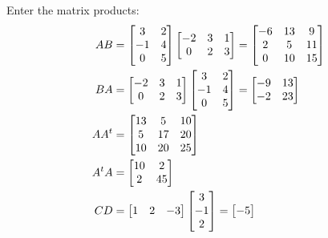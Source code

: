 \documentclass[handout]{ximera}
\begin{document}
\begin{exercise}
\begin{exercise}
Enter the matrix products: 
\begin{align*}
AB &= \begin{bmatrix}  3   &  2\\   -1  &  4\\   0   &  5 \end{bmatrix}
	\begin{bmatrix}   -2  &  3  &  1\\  0  &  2  &  3 \end{bmatrix}
	= \begin{bmatrix}    \answer{-6}  &  \answer{13}  &   \answer{9}\\
	  \answer{2}  &  \answer{5}   & \answer{11}\\  
	  \answer{0}  & \answer{10}  &  \answer{15}  \end{bmatrix} \\
BA &= \begin{bmatrix}   -2  &  3  &  1\\  0  &  2  &  3 \end{bmatrix}
	\begin{bmatrix}  3   &  2\\   -1  &  4\\   0   &  5 \end{bmatrix}
	= \begin{bmatrix}   \answer{-9}  &  \answer{13}\\   \answer{-2}  &  \answer{23}  \end{bmatrix} \\
AA^t &= \begin{bmatrix}  \answer{13}  &   \answer{5}  &  \answer{10}\\   
	\answer{5}   & \answer{17}  &  \answer{20}\\  
	\answer{10}  &  \answer{20}  &  \answer{25}  \end{bmatrix} \\
A^tA &= \begin{bmatrix}    \answer{10}  &   \answer{2}\\   \answer{2}  &  \answer{45}  \end{bmatrix} \\
CD &=  \begin{bmatrix}  1  &   2 &   -3\end{bmatrix}
	\begin{bmatrix} 3\\  -1\\ 2  \end{bmatrix}
	= \begin{bmatrix}  \answer{-5} \end{bmatrix} \\

\end{align*}
\end{exercise}
\end{exercise}
\end{document}
